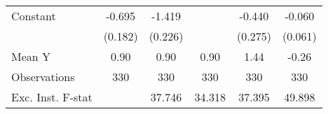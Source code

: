 {\begin{tabular}{l*{5}{c}}
\addlinespace
Constant            &      -0.695\sym{***}&      -1.419\sym{***}&                     &      -0.440         &      -0.060         \\
                    &     (0.182)         &     (0.226)         &                     &     (0.275)         &     (0.061)         \\
\midrule
Mean Y              &        0.90         &        0.90         &        0.90         &        1.44         &       -0.26         \\
Observations        &         330         &         330         &         330         &         330         &         330         \\
Exc. Inst. F-stat   &                     &      37.746         &      34.318         &      37.395         &      49.898         \\
\bottomrule
\end{tabular}
}
